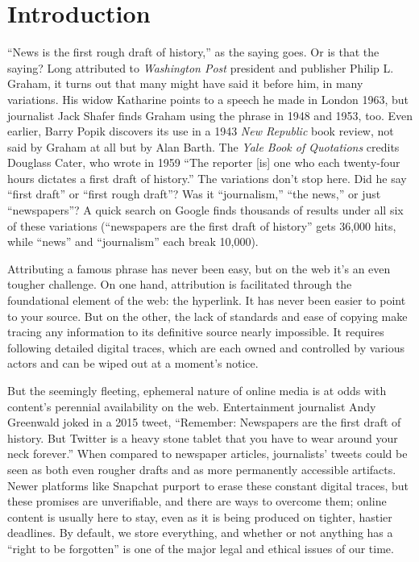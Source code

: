 \chapter{Introduction}

``News is the first rough draft of history,'' as the saying goes. Or is that the saying? Long attributed to \emph{Washington Post} president and publisher Philip L. Graham, it turns out that many might have said it before him, in many variations. His widow Katharine points to a speech he made in London 1963, but journalist Jack Shafer finds Graham using the phrase in 1948 and 1953, too.\autocite{shafer_who_2010} Even earlier, Barry Popik discovers its use in a 1943 \emph{New Republic} book review, not said by Graham at all but by Alan Barth. The \emph{Yale Book of Quotations} credits Douglass Cater, who wrote in 1959 ``The reporter [is] one who each twenty-four hours dictates a first draft of history.''\autocite[139]{shapiro_yale_2006} The variations don't stop here. Did he say ``first draft'' or ``first rough draft''? Was it ``journalism,'' ``the news,'' or just ``newspapers''\thinspace? A quick search on Google finds thousands of results under all six of these variations (``newspapers are the first draft of history'' gets 36,000 hits, while ``news'' and ``journalism'' each break 10,000).

Attributing a famous phrase has never been easy, but on the web it's an even tougher challenge. On one hand, attribution is facilitated through the foundational element of the web: the hyperlink. It has never been easier to point to your source. But on the other, the lack of standards and ease of copying make tracing any information to its definitive source nearly impossible. It requires following detailed digital traces, which are each owned and controlled by various actors and can be wiped out at a moment's notice.

But the seemingly fleeting, ephemeral nature of online media is at odds with content's perennial availability on the web. Entertainment journalist Andy Greenwald joked in a 2015 tweet, ``Remember: Newspapers are the first draft of history. But Twitter is a heavy stone tablet that you have to wear around your neck forever.''\autocite{greenwald_remember:_2015} When compared to newspaper articles, journalists' tweets could be seen as both even rougher drafts and as more permanently accessible artifacts. Newer platforms like Snapchat purport to erase these constant digital traces, but these promises are unverifiable, and there are ways to overcome them; online content is usually here to stay, even as it is being produced on tighter, hastier deadlines. By default, we store everything, and whether or not anything has a ``right to be forgotten'' is one of the major legal and ethical issues of our time.\autocites[See, e.g.,][]{arthur_explaining_2014}{hakim_right_2014}

